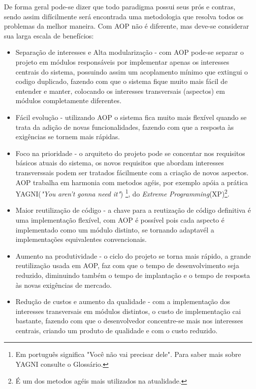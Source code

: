 \documentclass[tc,openright]{iiufrgs}
\begin{document}
De forma geral pode-se dizer que todo paradigma possui seus prós e contras, sendo assim difícilmente será encontrada uma metodologia que resolva todos os problemas da melhor maneira. Com AOP não é diferente, mas deve-se considerar sua larga escala de benefícios:

\begin{itemize}
\item Separação de interesses e Alta modularização - com AOP pode-se separar o projeto em módulos responsáveis por implementar apenas os interesses centrais do sistema, possuindo assim um acoplamento mínimo que extingui o codigo duplicado, fazendo com que o sistema fique muito mais fácil de entender e manter, colocando os interesses transversais (aspectos) em módulos completamente diferentes.\cite{laddad2003aspectj} 
\item Fácil evolução - utilizando AOP o sistema fica muito mais flexível quando se trata da adição de novas funcionalidades, fazendo com que a resposta às exigências se tornem mais rápidas.
\item Foco na prioridade - o arquiteto do projeto pode se concentar nos requisitos básicos atuais do sistema, os novos requisitos que abordam interesses transverssais podem ser tratados fácilmente com a criação de novos aspectos. AOP trabalha em harmonia com metodos agéis, por exemplo apóia a prática YAGNI(\textit{"You aren’t gonna need it"}) \footnote{Em português significa "Você não vai precisar dele". Para saber mais sobre YAGNI consulte o Glossário.}, do \textit{Extreme Programming}(XP)\footnote{É um dos metodos agéis mais utilizados na atualidade.}.\cite{laddad2003aspectj} 
\item Maior reutilização de código - a chave para a reutização de código definitiva é uma implementação flexível, com AOP é possível pois cada aspecto é implementado como um módulo distinto, se tornando adaptavél a implementações equivalentes convencionais.\cite{laddad2003aspectj} 
\item Aumento na produtividade - o ciclo do projeto se torna mais rápido, a grande reutilização usada em AOP, faz com que o tempo de desenvolvimento seja reduzido, diminuindo também o tempo de implantação e o tempo de resposta às novas exigências de mercado. \cite{laddad2003aspectj} 
\item Redução de custos e aumento da qualidade - com a implementação dos interesses transversais em módulos distintos, o custo de implementação cai bastante, fazendo com que o desenvolvedor concentre-se mais nos interesses centrais, criando um produto de qualidade e com o custo reduzido.
\end{itemize}
\end{document}
